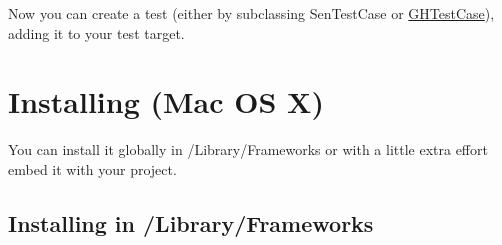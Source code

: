 \-Now you can create a test (either by subclassing {\ttfamily \-Sen\-Test\-Case} or {\ttfamily \hyperlink{interface_g_h_test_case}{\-G\-H\-Test\-Case}}), adding it to your test target.\hypertarget{_installing_InstallMacOSX}{}\section{\-Installing (\-Mac O\-S X)}\label{_installing_InstallMacOSX}
\-You can install it globally in /\-Library/\-Frameworks or with a little extra effort embed it with your project.\hypertarget{_installing_InstallLibraryFrameworks}{}\subsection{\-Installing in /\-Library/\-Frameworks}\label{_installing_InstallLibraryFrameworks}

